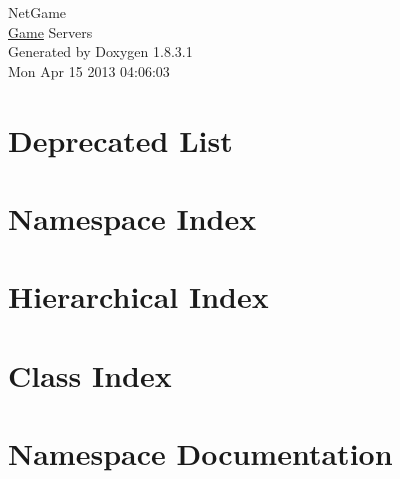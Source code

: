 \documentclass{book}
\begin{document}
\hypersetup{pageanchor=false,citecolor=blue}
\begin{titlepage}
\vspace*{7cm}
\begin{center}
{\Large Net\-Game \\[1ex]\large \hyperlink{class_game}{Game} Servers }\\
\vspace*{1cm}
{\large Generated by Doxygen 1.8.3.1}\\
\vspace*{0.5cm}
{\small Mon Apr 15 2013 04:06:03}\\
\end{center}
\end{titlepage}
\clearemptydoublepage
{}
\tableofcontents
\clearemptydoublepage
{}
\hypersetup{pageanchor=true,citecolor=blue}
\chapter{Deprecated List}
\label{deprecated}
\hypertarget{deprecated}{}

\chapter{Namespace Index}

\chapter{Hierarchical Index}

\chapter{Class Index}

\chapter{Namespace Documentation}


\end{document}
